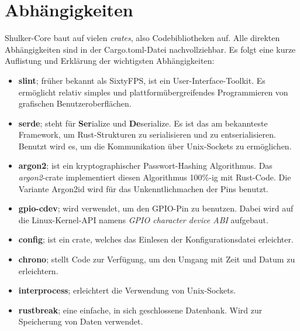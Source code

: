 \section{Abhängigkeiten}
Shulker-Core baut auf vielen \textit{crates}, also Codebibliotheken auf. Alle direkten Abhängigkeiten sind in der 
Cargo.toml-Datei nachvollziehbar. Es folgt eine kurze Auflistung und Erklärung der wichtigsten Abhängigkeiten:

\begin{itemize}
    \item \textbf{slint}; früher bekannt als SixtyFPS, ist ein User-Interface-Toolkit. Es ermöglicht relativ simples
    und plattformübergreifendes Programmieren von grafischen Benutzeroberflächen.

    \item \textbf{serde}; steht für \textbf{Ser}ialize und \textbf{De}serialize. Es ist das am bekannteste Framework,
    um Rust-Strukturen zu serialisieren und zu entserialisieren. Benutzt wird es, um die Kommunikation über Unix-Sockets zu
    ermöglichen.

    \item \textbf{argon2}; ist ein kryptographischer Passwort-Hashing Algorithmus. Das \textit{argon2}-crate implementiert diesen
    Algorithmus 100\%-ig mit Rust-Code. Die Variante Argon2id wird für das Unkenntlichmachen der Pins benutzt.

    \item \textbf{gpio-cdev}; wird verwendet, um den GPIO-Pin zu benutzen. Dabei wird auf die Linux-Kernel-API namens \textit{GPIO character device ABI}
    aufgebaut.

    \item \textbf{config}; ist ein crate, welches das Einlesen der Konfigurationsdatei erleichter.
    
    \item \textbf{chrono}; stellt Code zur Verfügung, um den Umgang mit Zeit und Datum zu erleichtern.
    
    \item \textbf{interprocess}; erleichtert die Verwendung von Unix-Sockets.
    
    \item \textbf{rustbreak}; eine einfache, in sich geschlossene Datenbank. Wird zur Speicherung von Daten verwendet.
\end{itemize}